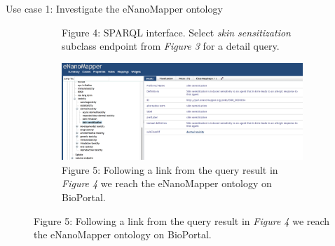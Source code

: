 \documentclass[final]{beamer}
\begin{document}
\begin{frame}{}
\begin{textblock}{63}
\begin{block}{Use case 1: Investigate the eNanoMapper ontology}
\begin{figure}
\begin{subfigure}[c]{0.35\textwidth}
            \caption{Figure 4: SPARQL interface. Select \emph{skin sensitization} subclass endpoint from \emph{Figure 3} for a detail query.}
          \end{subfigure}
          \hspace{0.12\textwidth}
          \begin{subfigure}[c]{0.35\textwidth}
            \includegraphics[scale=0.6,keepaspectratio]{onto-use-case-1d.png}
            \caption{Figure 5: Following a link from the query result in \emph{Figure 4} we reach the eNanoMapper ontology on BioPortal.}
          \end{subfigure}
        \end{figure}
      \end{block}
    \end{textblock}


\end{frame}
\end{document}
